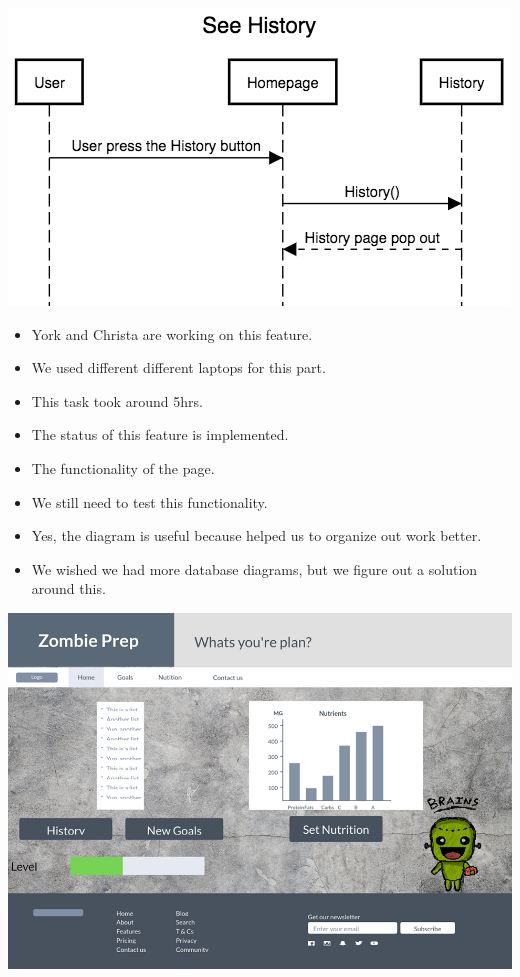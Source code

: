 \documentclass[a4paper]{article}
\begin{document}
\includegraphics[width=\textwidth, height=8 cm]{see_history.png}
\newline
\begin{itemize}
	\item York and Christa are working on this feature. 
	\item We used different different laptops for this part.
    \item This task took around 5hrs.
    \item The status of this feature is implemented.
  \item The functionality of the page.
  \item We still need to test this functionality. 
  \item Yes, the diagram is useful because helped us to organize out work better.
  \item We wished we had more database diagrams, but we figure out a solution around this.
\end{itemize}
\includegraphics[width=\textwidth, height=8 cm]{page.png}
\newline
\end{document}
